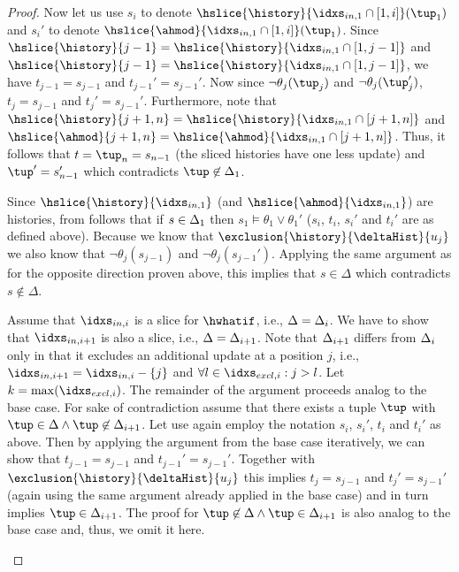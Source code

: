{\begin{proof}
Now let us use $s_i$ to denote $\hslice{\history}{\iini{1} \cap [1,i]}(\tup_1)$ and $s_i'$ to denote $\hslice{\ahmod}{\iini{1} \cap [1,i]}(\tup_1)$.
Since $\hslice{\history}{j-1} = \hslice{\history}{\iini{1} \cap [1,j-1]}$ and $\hslice{\history}{j-1} = \hslice{\history}{\iini{1} \cap [1,j-1]}$, we have $t_{j-1} = s_{j-1}$ and $t_{j-1}' = s_{j-1}'$. Now since $\neg \theta_j(\tup_j)$ and $\neg \theta_j(\tup_{j}')$, $t_j = s_{j-1}$ and $t_j' = s_{j-1}'$. Furthermore, note that $\hslice{\history}{j+1,n} = \hslice{\history}{\iini{1} \cap [j+1,n]}$ and $\hslice{\ahmod}{j+1,n} = \hslice{\ahmod}{\iini{1} \cap [j+1,n]}$. Thus, it follows that $t = \tup_n = s_{n-1}$ (the sliced histories have one less update) and $\tup' = s_{n-1}'$ which contradicts $\tup \not\in \dslicei{1}$.

Since $\hslice{\history}{\iini{1}}$ (and $\hslice{\ahmod}{\iini{1}}$) are histories, from  follows that if $s \in \Delta_{1}$ then $s_1 \models \theta_1 \vee \theta_1'$ ($s_i$, $t_i$, $s_i'$ and $t_i'$ are as defined above). Because we know that $\exclusion{\history}{\deltaHist}{u_j}$ we also know that $\neg \theta_j(s_{j-1})$ and $\neg \theta_j(s_{j-1}')$. Applying the same argument as for the opposite direction proven above, this implies that $s \in \Delta$ which contradicts $s \not \in \Delta$.

Assume that $\iini{i}$ is a slice for $\hwhatif$, i.e., $\Delta = \Delta_{i}$. We have to show that $\iini{i+1}$ is also a slice, i.e., $\Delta = \Delta_{i+1}$. Note that $\Delta_{i+1}$ differs from $\Delta_{i}$ only in that it excludes an additional update at a position $j$, i.e., $\iini{i+1} = \iini{i} - \{ j \}$ and $\forall l \in \iexi{i}: j > l$. Let $k = \max(\iexi{i})$. The remainder of the argument proceeds analog to the base case. For sake of contradiction assume that there exists a tuple $\tup$ with $\tup \in \Delta \land \tup \not\in \dslicei{i+1}$. Let use again employ the notation $s_i$, $s_i'$, $t_i$ and $t_i'$ as above. Then by applying the argument from the base case iteratively, we can show that $t_{j-1} = s_{j-1}$ and $t_{j-1}'= s_{j-1}'$. Together with $\exclusion{\history}{\deltaHist}{u_j}$ this implies $t_j = s_{j-1}$ and $t_{j}' = s_{j-1}'$ (again using the same argument already applied in the base case) and in turn implies $\tup \in \dslicei{i+1}$. The proof for $\tup \not\in \Delta \land \tup \in \dslicei{i+1}$ is also analog to the base case and, thus, we omit it here.

% 


    
    $\,$\\[-3.5mm]
  \end{proof}
}

